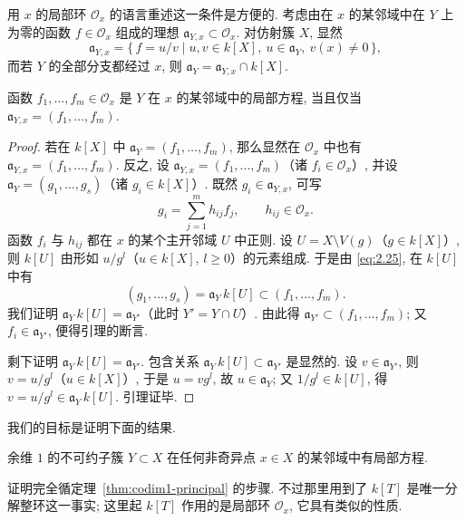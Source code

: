 用 $x$ 的局部环 $\mathcal O_x$ 的语言重述这一条件是方便的. 考虑由在 $x$ 的某邻域中在 $Y$ 上为零的函数 $f \in \mathcal O_x$ 组成的理想 $\mathfrak a_{Y,x} \subset \mathcal O_x$. 对仿射簇 $X$, 显然
\[
	\mathfrak a_{Y,x} = \{\, f = u/v \mid u, v \in k[X],\ u \in \mathfrak a_Y,\ v(x) \ne 0 \,\},
\]
而若 $Y$ 的全部分支都经过 $x$, 则 $\mathfrak a_Y = \mathfrak a_{Y,x} \cap k[X]$.

\begin{lemma}\label{lem:local-equations-ideal}
	函数 $f_1, \ldots, f_m \in \mathcal O_x$ 是 $Y$ 在 $x$ 的某邻域中的局部方程, 当且仅当 $\mathfrak a_{Y,x} = (f_1, \ldots, f_m)$.
\end{lemma}

\begin{proof}
	若在 $k[X]$ 中 $\mathfrak a_Y = (f_1, \ldots, f_m)$, 那么显然在 $\mathcal O_x$ 中也有 $\mathfrak a_{Y,x} = (f_1, \ldots, f_m)$. 反之, 设 $\mathfrak a_{Y,x} = (f_1, \ldots, f_m)$（诸 $f_i \in \mathcal O_x$）, 并设 $\mathfrak a_Y = (g_1, \ldots, g_s)$（诸 $g_i \in k[X]$）. 既然 $g_i \in \mathfrak a_{Y,x}$, 可写
	\begin{equation}
		\label{eq:2.25}
		g_i = \sum_{j=1}^{m} h_{ij} f_j, \qquad h_{ij} \in \mathcal O_x.
	\end{equation}
	函数 $f_i$ 与 $h_{ij}$ 都在 $x$ 的某个主开邻域 $U$ 中正则. 设 $U = X \setminus V(g)$（$g \in k[X]$）, 则 $k[U]$ 由形如 $u/g^l$（$u \in k[X]$, $l \ge 0$）的元素组成. 于是由 \eqref{eq:2.25}, 在 $k[U]$ 中有
	\[
		(g_1, \ldots, g_s) = \mathfrak a_Y\, k[U] \subset (f_1, \ldots, f_m).
	\]
	我们证明 $\mathfrak a_Y\, k[U] = \mathfrak a_{Y'}$（此时 $Y' = Y \cap U$）. 由此得 $\mathfrak a_{Y'} \subset (f_1, \ldots, f_m)$; 又 $f_i \in \mathfrak a_{Y'}$, 便得引理的断言.

	剩下证明 $\mathfrak a_Y\, k[U] = \mathfrak a_{Y'}$. 包含关系 $\mathfrak a_Y\, k[U] \subset \mathfrak a_{Y'}$ 是显然的. 设 $v \in \mathfrak a_{Y'}$, 则 $v = u/g^l$（$u \in k[X]$）, 于是 $u = v g^l$, 故 $u \in \mathfrak a_Y$; 又 $1/g^l \in k[U]$, 得 $v = u/g^l \in \mathfrak a_Y\, k[U]$. 引理证毕.
\end{proof}

我们的目标是证明下面的结果.

\begin{theorem}\label{thm:codim1-local-eq}
	余维 $1$ 的不可约子簇 $Y \subset X$ 在任何非奇异点 $x \in X$ 的某邻域中有局部方程.
\end{theorem}

证明完全循定理~\ref{thm:codim1-principal} 的步骤. 不过那里用到了 $k[T]$ 是唯一分解整环这一事实; 这里起 $k[T]$ 作用的是局部环 $\mathcal O_x$, 它具有类似的性质.

